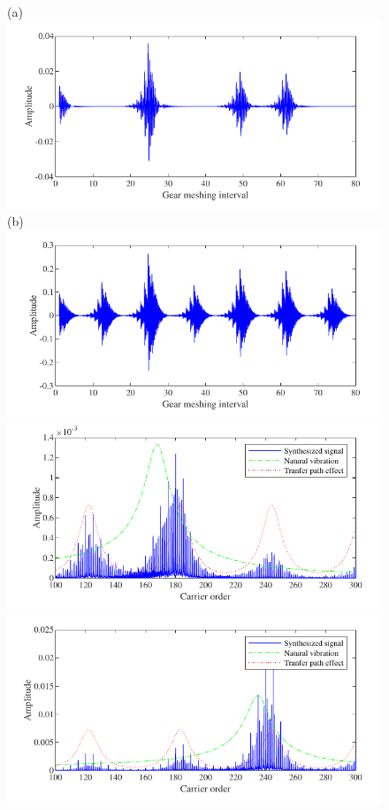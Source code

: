 \documentclass[a4paper,fleqn]{cas-sc}%
\begin{document}
\begin{figure}[pos=htbp]
    \centering
    (a) \includegraphics[scale=\myscale,valign=t]{Time_p5_fault_L30.pdf}
    (b) \includegraphics[scale=\myscale,valign=t]{Time_p5_fault_L300.pdf}\\
    \hspace*{1.5em}\includegraphics[scale=\myscale,valign=t]{Freq_p5_fault_L30.pdf}
    \hspace*{1.5em}\includegraphics[scale=\myscale,valign=t]{Freq_p5_fault_L300.pdf}

\end{figure}
\end{document}
